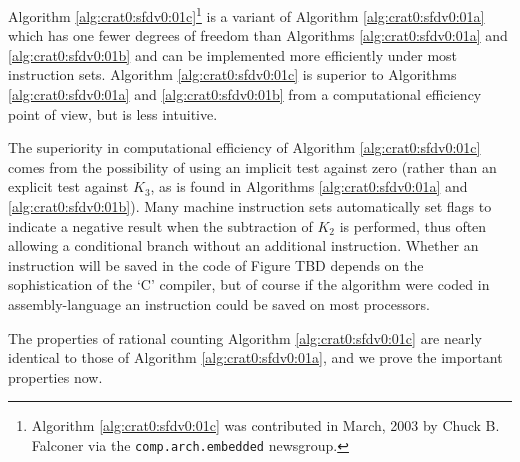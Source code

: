 Algorithm \ref{alg:crat0:sfdv0:01c}\footnote{Algorithm \ref{alg:crat0:sfdv0:01c} 
was contributed in March, 2003
by Chuck B. Falconer \cite{bibref:i:chuckbfalconer}
via the
\texttt{comp.arch.embedded} \cite{bibref:n:comparchembedded} 
newsgroup.}
is a variant of Algorithm \ref{alg:crat0:sfdv0:01a} 
which has one fewer
degrees of freedom than Algorithms \ref{alg:crat0:sfdv0:01a} 
and \ref{alg:crat0:sfdv0:01b} and can be implemented
more efficiently under most instruction sets.  Algorithm \ref{alg:crat0:sfdv0:01c} 
is superior to Algorithms \ref{alg:crat0:sfdv0:01a} 
and \ref{alg:crat0:sfdv0:01b}
from a computational efficiency
point of view, but is less intuitive.

The superiority in computational efficiency of Algorithm \ref{alg:crat0:sfdv0:01c} 
comes from the possibility of using an implicit test against zero 
(rather than an explicit
test against $K_3$, as is found in Algorithms \ref{alg:crat0:sfdv0:01a} 
and \ref{alg:crat0:sfdv0:01b}).
Many machine instruction sets automatically set flags to indicate a negative
result when the 
subtraction of $K_2$ is performed, thus often allowing a conditional branch
without an additional instruction.  Whether an instruction will be saved in
the code of Figure TBD
depends on the sophistication
of the `C' compiler, but of course if the algorithm were coded in
assembly-language an instruction could be saved on most processors.

The properties of rational counting Algorithm \ref{alg:crat0:sfdv0:01c} are nearly
identical to those of Algorithm \ref{alg:crat0:sfdv0:01a}, 
and we prove the important properties
now.

